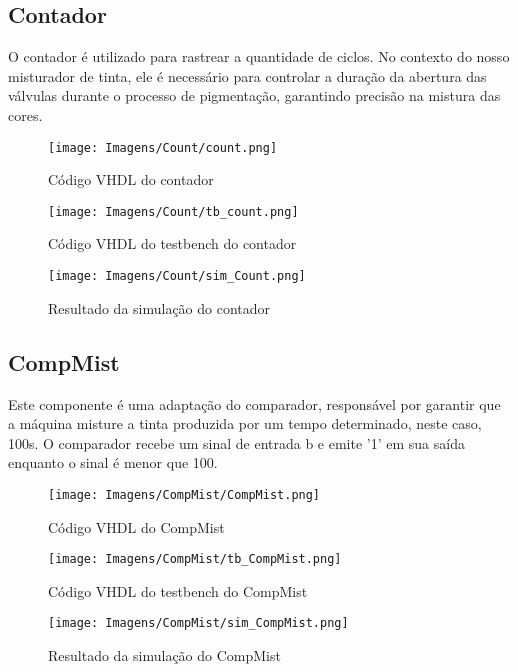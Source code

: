 \documentclass[12pt,a4paper,oneside]{abntex2}
\begin{document}
            \subsection{Contador}
                O contador é utilizado para rastrear a quantidade de ciclos. No contexto do nosso misturador de tinta, ele é necessário para controlar a duração da abertura das válvulas durante o processo de pigmentação, garantindo precisão na mistura das cores. 
                \begin{figure}[H]
                    \centering
                    \texttt{[image: Imagens/Count/count.png]}
                    \caption{Código VHDL do contador}
                    \label{fig:Contador}
                \end{figure}
                \begin{figure}[H]
                    \centering
                    \texttt{[image: Imagens/Count/tb\_count.png]}
                    \caption{Código VHDL do testbench do contador}
                    \label{fig:tb_Contador}
                \end{figure}
                \begin{figure}[H]
                    \centering
                    \texttt{[image: Imagens/Count/sim\_Count.png]}
                    \caption{Resultado da simulação do contador}
                    \label{fig:sim_Contador}
                \end{figure}

            
            \subsection{CompMist}
                Este componente é uma adaptação do comparador, responsável por garantir que a máquina misture a tinta produzida por um tempo determinado, neste caso, 100s. O comparador recebe um sinal de entrada b e emite '1' em sua saída enquanto o sinal é menor que 100. 
                \begin{figure}[H]
                    \centering
                    \texttt{[image: Imagens/CompMist/CompMist.png]}
                    \caption{Código VHDL do CompMist}
                    \label{fig:CompMist}
                \end{figure}
               \begin{figure}[H]
                    \centering
                    \texttt{[image: Imagens/CompMist/tb\_CompMist.png]}
                    \caption{Código VHDL do testbench do CompMist}
                    \label{fig:tb_CompMist}
                \end{figure}
                \begin{figure}[H]
                    \centering
                    \texttt{[image: Imagens/CompMist/sim\_CompMist.png]}
                    \caption{Resultado da simulação do CompMist}
                    \label{fig:sim_CompMist}
                \end{figure}
\end{document}
